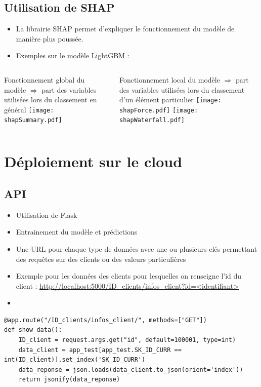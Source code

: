 \documentclass[8pt,aspectratio=169,hyperref={unicode=true}]{beamer}
\begin{document}
\subsection{Utilisation de SHAP}
\begin{frame}{\insertsection}{\insertsubsection}
    \begin{itemize}
        \item La librairie SHAP permet d'expliquer le fonctionnement du modèle de manière plus poussée.
        \item Exemples sur le modèle LightGBM :
    \end{itemize}
    \begin{columns}[t]
        \begin{column}{.5\textwidth}
            Fonctionnement global du modèle $\Longrightarrow$ part des variables utilisées lors du classement en général
            \texttt{[image: shapSummary.pdf]}
        \end{column}
        \begin{column}{.5\textwidth}
            Fonctionnement local du modèle $\Longrightarrow$ part des variables utilisées lors du classement d'un élément particulier
            \texttt{[image: shapForce.pdf]}
            \texttt{[image: shapWaterfall.pdf]}
        \end{column}
    \end{columns}
\end{frame}


\section{Déploiement sur le cloud}
\subsection{API}
\begin{frame}[fragile]{\insertsection}{\insertsubsection}
    \begin{itemize}
        \item Utilisation de Flask
        \item Entrainement du modèle et prédictions
        \item Une URL pour chaque type de données avec une ou plusieurs clés permettant des requêtes sur des clients ou des valeurs particulières
        \item Exemple pour les données des clients pour lesquelles on renseigne l'id du client : \url{http://localhost:5000/ID_clients/infos_client?id=<identifiant>}
        \item[]
    \end{itemize}
    \begin{verbatim}
@app.route("/ID_clients/infos_client/", methods=["GET"])
def show_data():
    ID_client = request.args.get("id", default=100001, type=int)
    data_client = app_test[app_test.SK_ID_CURR == int(ID_client)].set_index('SK_ID_CURR')
    data_reponse = json.loads(data_client.to_json(orient='index'))
    return jsonify(data_reponse)    
    \end{verbatim}
\end{frame}
\end{document}
